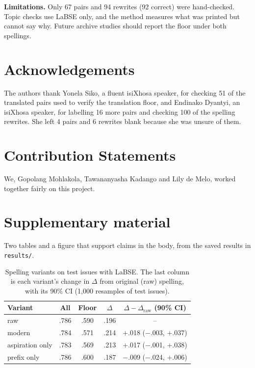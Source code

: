 \documentclass[10pt,letterpaper]{article}
\begin{document}
\textbf{Limitations.} Only 67 pairs and 94 rewrites (92 correct) were hand-checked. Topic checks use
LaBSE only, and the method measures what was printed but cannot say why. Future archive studies should
report the floor under both spellings.

\section*{Acknowledgements}
The authors thank Yonela Siko, a fluent isiXhosa speaker, for checking 51 of the translated pairs used to verify the translation floor, and Endinako Dyantyi, an isiXhosa speaker, for labelling 16 more pairs and checking 100 of the spelling rewrites. She left 4 pairs and 6 rewrites blank because she was unsure of them.

\section{Contribution Statements}
We, Gopolang Mohlakola, Tawananyasha Kadango and Lily de Melo, worked together fairly on this project.



\setlength{\bibleftmargin}{.125in}
\setlength{\bibindent}{-\bibleftmargin}



\setlength{\parindent}{10pt} %
\onecolumn


\clearpage
\raggedbottom
\captionsetup{font=sf, width=0.95\linewidth, skip=7pt}
\section*{Supplementary material}
\setcounter{figure}{0}
\renewcommand{\thefigure}{S\arabic{figure}}
Two tables and a figure that support claims in the body, from the saved results in \texttt{results/}.

\begin{table}[H]
\renewcommand{\thetable}{S1}
\centering\small
\caption{ Spelling variants on test issues with LaBSE. The last column is each variant's change in $\Delta$ from original (raw) spelling, with its 90\% CI (1{,}000 resamples of test issues).}
\label{tab:spelling}
\begin{tabular}{@{}lcccc@{}}
\toprule
Variant & All & Floor & $\Delta$ & $\Delta-\Delta_\mathrm{raw}$ (90\% CI)\\
\midrule
raw & .786 & .590 & .196 & -- \\
modern & .784 & .571 & .214 & $+$.018 ($-$.003, $+$.037)\\
aspiration only & .783 & .569 & .213 & $+$.017 ($-$.001, $+$.038)\\
prefix only & .786 & .600 & .187 & $-$.009 ($-$.024, $+$.006)\\
\bottomrule
\end{tabular}
\end{table}
\end{document}
